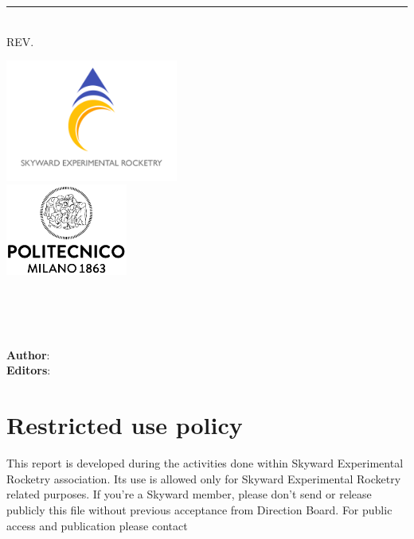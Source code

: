 
\thispagestyle{empty}

\begin{center}
    \large{\myDate}\\
    \vspace{0.5cm}
    \titlecap{\myTitle}\\
    \rule{\linewidth}{0.5mm}
    \titlecap{\mySubtitle}\\
    \vspace{0.4cm}
    \large{REV. \myRevision}
\end{center}
\vfill
\begin{multicols}{2}
    \centering
    \includegraphics[height=4cm]{Graphics/Logo colour.pdf}\\
    \includegraphics[height=3cm]{Graphics/Logo Polimi.pdf}
    
    \columnbreak
    
    \centering
	\subtitlecap{\myIPT} \\
	\vspace{0.7em}
	\normalsize
	\textrm{
	    \myGroup\\
	    \myUni 
    }\\
	\vspace{0.7em}

    \textbf{Author}: {\myAuthor}\\
    \textbf{Editors}: {\myEditors}

    \raggedright
	\section*{Restricted use policy}
    \fontsize{8}{11} \selectfont This report is developed during the activities done within Skyward Experimental Rocketry association. Its use is allowed only for Skyward Experimental Rocketry related purposes. If you're a Skyward member, please don't send or release publicly this file without previous acceptance from Direction Board. For public access and publication please contact
\end{multicols}
\clearpage